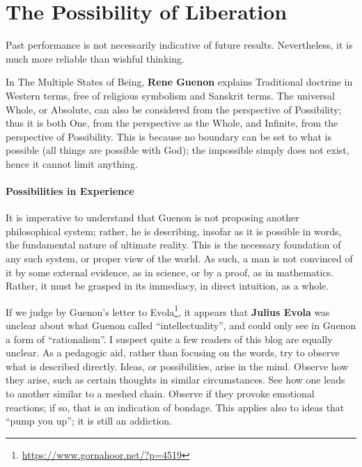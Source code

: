 \section{The Possibility of Liberation}

\begin{quotex}
Past performance is not necessarily indicative of future results. Nevertheless, it is much more reliable than wishful thinking. 

\end{quotex}
In The Multiple States of Being, \textbf{Rene Guenon} explains Traditional doctrine in Western terms, free of religious symbolism and Sanskrit terms. The universal Whole, or Absolute, can also be considered from the perspective of Possibility; thus it is both One, from the perspective as the Whole, and Infinite, from the perspective of Possibility. This is because no boundary can be set to what is possible (all things are possible with God); the impossible simply does not exist, hence it cannot limit anything.

\paragraph{Possibilities in Experience}
It is imperative to understand that Guenon is not proposing another philosophical system; rather, he is describing, insofar as it is possible in words, the fundamental nature of ultimate reality. This is the necessary foundation of any such system, or proper view of the world. As such, a man is not convinced of it by some external evidence, as in science, or by a proof, as in mathematics. Rather, it must be grasped in its immediacy, in direct intuition, as a whole.

If we judge by Guenon's letter to Evola\footnote{\url{https://www.gornahoor.net/?p=4519}}, it appears that \textbf{Julius Evola} was unclear about what Guenon called “intellectuality”, and could only see in Guenon a form of “rationalism”. I suspect quite a few readers of this blog are equally unclear. As a pedagogic aid, rather than focusing on the words, try to observe what is described directly. Ideas, or possibilities, arise in the mind. Observe how they arise, such as certain thoughts in similar circumstances. See how one leads to another similar to a meshed chain. Observe if they provoke emotional reactions; if so, that is an indication of bondage. This applies also to ideas that “pump you up”; it is still an addiction.

